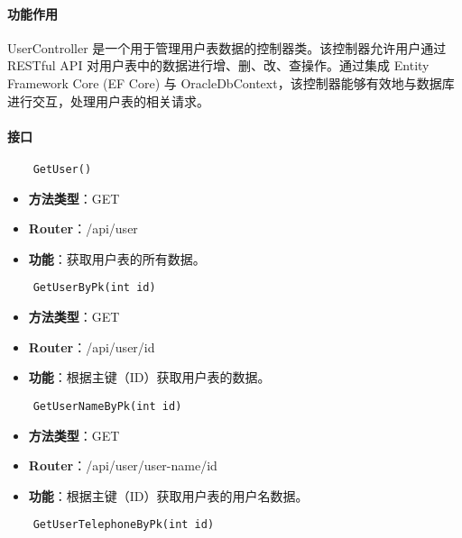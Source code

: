 \paragraph{功能作用}

UserController 是一个用于管理用户表数据的控制器类。该控制器允许用户通过 RESTful API 对用户表中的数据进行增、删、改、查操作。通过集成 Entity Framework Core (EF Core) 与 OracleDbContext，该控制器能够有效地与数据库进行交互，处理用户表的相关请求。

\paragraph{接口}

\begin{verbatim}
	GetUser()
\end{verbatim}

\begin{itemize}
	\item \textbf{方法类型}：GET
	\item \textbf{Router}：/api/user
	\item \textbf{功能}：获取用户表的所有数据。
\end{itemize}

\begin{verbatim}
	GetUserByPk(int id)
\end{verbatim}

\begin{itemize}
	\item \textbf{方法类型}：GET
	\item \textbf{Router}：/api/user/{id}
	\item \textbf{功能}：根据主键（ID）获取用户表的数据。
\end{itemize}

\begin{verbatim}
	GetUserNameByPk(int id)
\end{verbatim}

\begin{itemize}
	\item \textbf{方法类型}：GET
	\item \textbf{Router}：/api/user/user-name/{id}
	\item \textbf{功能}：根据主键（ID）获取用户表的用户名数据。
\end{itemize}

\begin{verbatim}
	GetUserTelephoneByPk(int id)
\end{verbatim}

